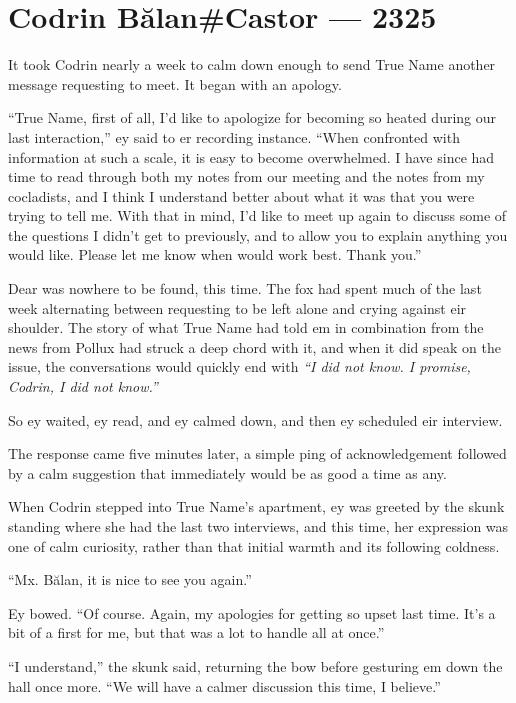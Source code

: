 \hypertarget{codrin-bux103lancastor-2325}{%
\chapter{Codrin Bălan\#Castor — 2325}\label{codrin-bux103lancastor-2325}}

It took Codrin nearly a week to calm down enough to send True Name another message requesting to meet. It began with an apology.

``True Name, first of all, I'd like to apologize for becoming so heated during our last interaction,'' ey said to er recording instance. ``When confronted with information at such a scale, it is easy to become overwhelmed. I have since had time to read through both my notes from our meeting and the notes from my cocladists, and I think I understand better about what it was that you were trying to tell me. With that in mind, I'd like to meet up again to discuss some of the questions I didn't get to previously, and to allow you to explain anything you would like. Please let me know when would work best. Thank you.''

Dear was nowhere to be found, this time. The fox had spent much of the last week alternating between requesting to be left alone and crying against eir shoulder. The story of what True Name had told em in combination from the news from Pollux had struck a deep chord with it, and when it did speak on the issue, the conversations would quickly end with \emph{``I did not know. I promise, Codrin, I did not know.''}

So ey waited, ey read, and ey calmed down, and then ey scheduled eir interview.

The response came five minutes later, a simple ping of acknowledgement followed by a calm suggestion that immediately would be as good a time as any.

When Codrin stepped into True Name's apartment, ey was greeted by the skunk standing where she had the last two interviews, and this time, her expression was one of calm curiosity, rather than that initial warmth and its following coldness.

``Mx. Bălan, it is nice to see you again.''

Ey bowed. ``Of course. Again, my apologies for getting so upset last time. It's a bit of a first for me, but that was a lot to handle all at once.''

``I understand,'' the skunk said, returning the bow before gesturing em down the hall once more. ``We will have a calmer discussion this time, I believe.''

